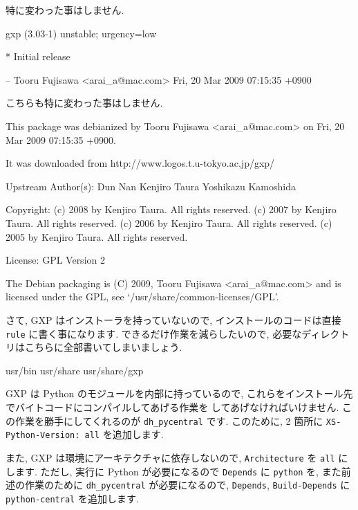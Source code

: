 \documentclass[mingoth,a4paper]{jsarticle}
\begin{document}
\begin{commandline}
特に変わった事はしません.

\begin{commandline}
gxp (3.03-1) unstable; urgency=low

  * Initial release

 -- Tooru Fujisawa <arai_a@mac.com>  Fri, 20 Mar 2009 07:15:35 +0900
\end{commandline}


こちらも特に変わった事はしません.

\begin{commandline}
This package was debianized by Tooru Fujisawa <arai_a@mac.com> on
Fri, 20 Mar 2009 07:15:35 +0900.

It was downloaded from http://www.logos.t.u-tokyo.ac.jp/gxp/

Upstream Author(s): 
    Dun Nan
    Kenjiro Taura 
    Yoshikazu Kamoshida 

Copyright:
    (c) 2008 by Kenjiro Taura. All rights reserved.
    (c) 2007 by Kenjiro Taura. All rights reserved.
    (c) 2006 by Kenjiro Taura. All rights reserved.
    (c) 2005 by Kenjiro Taura. All rights reserved.

License:
    GPL Version 2

The Debian packaging is (C) 2009, Tooru Fujisawa <arai_a@mac.com> and
is licensed under the GPL, see `/usr/share/common-licenses/GPL'.
\end{commandline}


さて, GXP はインストーラを持っていないので,
インストールのコードは直接 \verb|rule| に書く事になります.
できるだけ作業を減らしたいので, 必要なディレクトリはこちらに全部書いてしまいましょう.

\begin{commandline}
usr/bin
usr/share
usr/share/gxp
\end{commandline}


GXP は Python のモジュールを内部に持っているので,
これらをインストール先でバイトコードにコンパイルしてあげる作業を
してあげなければいけません.
この作業を勝手にしてくれるのが \verb|dh_pycentral| です.
このために, 2 箇所に \verb|XS-Python-Version: all| を追加します.

また, GXP は環境にアーキテクチャに依存しないので, \verb|Architecture| を
\verb|all| にします.
ただし, 実行に Python が必要になるので \verb|Depends| に \verb|python| を,
また前述の作業のために \verb|dh_pycentral| が必要になるので,
\verb|Depends|, \verb|Build-Depends| に \verb|python-central| を追加します.


\end{commandline}
\end{document}
